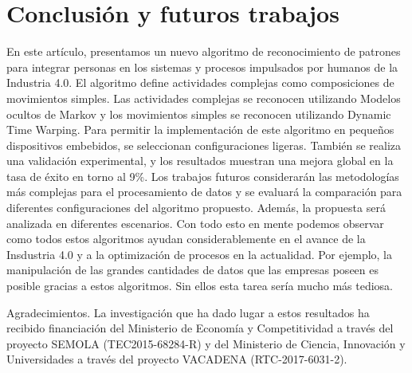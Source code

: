 \documentclass[10pt]{article}
\begin{document}
\section{Conclusión y futuros trabajos}
En este artículo, presentamos un nuevo algoritmo de reconocimiento de patrones para integrar personas en los sistemas y procesos impulsados por humanos de la Industria 4.0. El algoritmo define actividades complejas como composiciones de movimientos simples. Las actividades complejas se reconocen utilizando Modelos ocultos de Markov y los movimientos simples se reconocen utilizando Dynamic Time Warping. 
Para permitir la implementación de este algoritmo en pequeños dispositivos embebidos, se seleccionan configuraciones ligeras. También se realiza una validación experimental, y los resultados muestran una mejora global en la tasa de éxito en torno al 9\%. Los trabajos futuros considerarán las metodologías más complejas para el procesamiento de datos y se evaluará la comparación para diferentes configuraciones del algoritmo propuesto. Además, la propuesta será analizada en diferentes escenarios. 
Con todo esto en mente podemos observar como todos estos algoritmos ayudan considerablemente en el avance de la Insdustria 4.0 y a la optimización de procesos en la actualidad. Por ejemplo, la manipulación de las grandes cantidades de datos que las empresas poseen es posible gracias a estos algoritmos. Sin ellos esta tarea sería mucho más tediosa.


Agradecimientos. La investigación que ha dado lugar a estos resultados ha recibido financiación del Ministerio de Economía y Competitividad a través del proyecto SEMOLA (TEC2015-68284-R) y del Ministerio de Ciencia, Innovación y Universidades a través del proyecto VACADENA (RTC-2017-6031-2).
\end{document}
